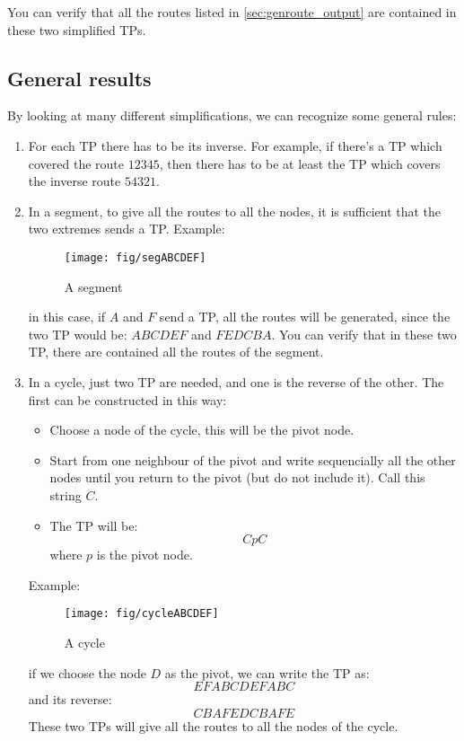 \documentclass[a4paper]{article}
\begin{document}
You can verify that all the routes listed in \ref{sec:genroute_output} are
contained in these two simplified TPs.

\subsection{General results}
By looking at many different simplifications, we can recognize some general
rules:
\begin{enumerate}
	\item For each TP there has to be its inverse. For example, if there's
		a TP which covered the route $12345$, then there has to be at
		least the TP which covers the inverse route $54321$.
	\item In a segment, to give all the routes to all the nodes, it is
		sufficient that the two extremes sends a TP. Example:
		\begin{figure}[h]
			\begin{center}
				\texttt{[image: fig/segABCDEF]}
			\end{center}
			\caption{A segment}
		\end{figure}
		in this case, if $A$ and $F$ send a TP, all the routes will be
		generated, since the two TP would be: $ABCDEF$ and $FEDCBA$.
		You can verify that in these two TP, there are contained all
		the routes of the segment.
	\item In a cycle, just two TP are needed, and one is the reverse of
		the other. The first can be constructed in this way: 
		\begin{itemize}
			\item Choose a node of the cycle, this will be the
				pivot node.
			\item Start from one neighbour of the pivot and write
				sequencially all the other nodes until you
				return to the pivot (but do not include it).
				Call this string $C$.
			\item The TP will be:
				\[CpC\]
				where $p$ is the pivot node.
		\end{itemize}
		Example:
		\begin{figure}[h]
			\begin{center}
				\texttt{[image: fig/cycleABCDEF]}
			\end{center}
			\caption{A cycle}
		\end{figure}
		if we choose the node $D$ as the pivot, we can write the TP
		as:
		\[ EFABCDEFABC \]
		and its reverse:
		\[ CBAFEDCBAFE \]
		These two TPs will give all the routes to all the nodes of the
		cycle.
\end{enumerate}
\end{document}
